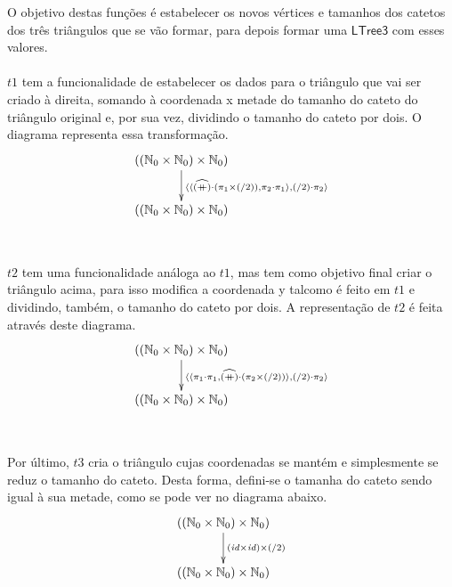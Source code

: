 \documentclass[a4paper]{article}
\newcommand{\Varid}[1]{\mathit{#1}}
\begin{document}
O objetivo destas funções é estabelecer os novos vértices e tamanhos dos catetos
 dos três triângulos que se vão formar, para depois formar uma \ensuremath{\mathsf{LTree3}} com esses 
valores. 
\\
\\
\ensuremath{\Varid{t1}} tem a funcionalidade de estabelecer os dados para o triângulo que vai ser criado à direita, somando à coordenada x metade do tamanho do cateto do triângulo original e, por sua vez, dividindo o tamanho do cateto por dois. O diagrama representa essa transformação.
\begin{eqnarray*}
\xymatrix@C=2cm{
    \ensuremath{((\N_0\times\N_0)\times\N_0)}
           \ar[d]^-{\ensuremath{\conj{\conj{\uncurry{(\mathbin{+\!\!\!+})}\comp (\p1\times(\mathbin{/}\mathrm{2}))}{\p2\comp \p1}}{(\mathbin{/}\mathrm{2})\comp \p2}}}
\\
    \ensuremath{((\N_0\times\N_0)\times\N_0)}
}
\end{eqnarray*}
\\
\\
\ensuremath{\Varid{t2}} tem uma funcionalidade análoga ao \ensuremath{\Varid{t1}}, mas tem como objetivo final criar o triângulo acima, para isso modifica a coordenada y talcomo é feito em \ensuremath{\Varid{t1}} e dividindo, também, o tamanho do cateto por dois. A representação de \ensuremath{\Varid{t2}} é feita através deste diagrama.
\begin{eqnarray*}
\xymatrix@C=2cm{
    \ensuremath{((\N_0\times\N_0)\times\N_0)}
           \ar[d]^-{\ensuremath{\conj{\conj{\p1\comp \p1}{\uncurry{(\mathbin{+\!\!\!+})}\comp (\p2\times(\mathbin{/}\mathrm{2}))}}{(\mathbin{/}\mathrm{2})\comp \p2}}}
\\
    \ensuremath{((\N_0\times\N_0)\times\N_0)}
}
\end{eqnarray*}
\\
\\
Por último, \ensuremath{\Varid{t3}} cria o triângulo cujas coordenadas se mantém e simplesmente se reduz o tamanho do cateto. Desta forma, defini-se o tamanha do cateto sendo igual à sua metade, como se pode ver no diagrama abaixo.
\begin{eqnarray*}
\xymatrix@C=2cm{
    \ensuremath{((\N_0\times\N_0)\times\N_0)}
           \ar[d]^-{\ensuremath{(\Varid{id}\times\Varid{id})\times(\mathbin{/}\mathrm{2})}}
\\
    \ensuremath{((\N_0\times\N_0)\times\N_0)}
}
\end{eqnarray*}
\\
\\
\end{document}
